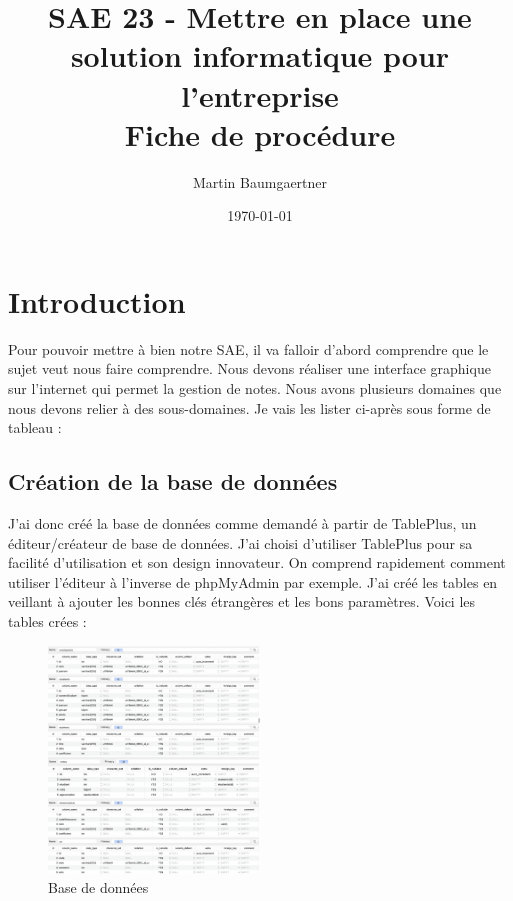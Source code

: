 \documentclass[12pt, a4paper]{article}
\begin{document}
    \title{\huge SAE 23 - Mettre en place une
    solution informatique pour l'entreprise \\ \Large \medskip Fiche de procédure}
    \author{Martin Baumgaertner}
    \date{\today}
    \maketitle
    \maketitle
    \newpage
    \tableofcontents
    \newpage
    \section{Introduction}
    Pour pouvoir mettre à bien notre SAE, il va falloir d’abord comprendre que le sujet veut nous faire comprendre. Nous devons réaliser une interface graphique sur l’internet qui permet la gestion de notes. 
    Nous avons plusieurs domaines que nous devons relier à des sous-domaines. Je vais les lister ci-après sous forme de tableau :
        \subsection{Création de la base de données}
        J’ai donc créé la base de données comme demandé à partir de TablePlus, un éditeur/créateur de base de données. J’ai choisi d’utiliser TablePlus pour sa facilité d’utilisation et son design innovateur. On comprend rapidement comment utiliser l’éditeur à l’inverse de phpMyAdmin par exemple. 
        J’ai créé les tables en veillant à ajouter les bonnes clés étrangères et les bons paramètres. Voici les tables crées : 
        \begin{figure}[h]
            \centering
            \includegraphics[width=0.5\textwidth]{img1.png}
            \caption{Base de données}
            \label{fig:basededonnees}
        \end{figure}
        \newpage
\end{document}
